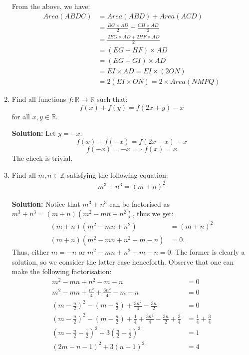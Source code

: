 \documentclass{article}
\begin{document}
\begin{enumerate}[itemsep=24pt]
From the above, we have:
\begin{align*}
Area(ABDC) & = Area(ABD) + Area(ACD) \\
           & = \frac{BG \times AD}{2} + \frac{CH \times AD}{2} \\
           & = \frac{2EG \times AD + 2HF \times AD}{2}\\
           & = (EG + HF) \times AD\\
           & = (EG + GI) \times AD\\
           & = EI \times AD = EI \times (2ON) \\
           & = 2(EI \times ON) = 2 \times Area(NMPQ)
\end{align*}


\item %
Find all functions $f:\mathbb{R}\to\mathbb{R}$ such that:
\[f(x) + f(y) = f(2x+y) - x\] for all $x,y\in\mathbb{R}$.

\textbf{Solution:} Let $y = -x$:
\[f(x) + f(-x) = f(2x-x) - x\]
\[f(-x) = -x\implies f(x) = x\]
The check is trivial.

\item 
Find all $m,n\in \mathbb{Z}$ satisfying the following equation:
\begin{align}
m^3 + n^3 = (m+n)^2 
\end{align}

\textbf{Solution:} Notice that $m^3 + n^3$ can be factorised as $m^3 + n^3=(m+n)(m^{2} -mn + n^{2})$, thus we get:
\begin{align*}
    (m+n)(m^{2} -mn + n^{2}) & = (m+n)^2\\
    (m+n)(m^{2} -mn + n^{2} -m -n) & = 0.
\end{align*}
Thus, either $m = -n$ or $m^{2} -mn + n^{2} -m -n = 0$. The former is clearly a solution, so we consider the latter case henceforth. Observe that one can make the following factorisation:
\begin{align}
    m^{2} -mn + n^{2} -m -n & = 0 \nonumber\\ 
    m^{2} - mn + \frac{n^{2}}{4} + \frac{3n^{2}}{4} - m -n & = 0 \nonumber\\
    \left(m - \frac{n}{2}\right)^{2} - \left(m - \frac{n}{2}\right) + \frac{3n^{2}}{4} - \frac{3n}{2} & = 0 \nonumber\\
    \left(m - \frac{n}{2}\right)^{2} - \left(m - \frac{n}{2}\right) + \frac{1}{4} + \frac{3n^{2}}{4} - \frac{3n}{2} + \frac{3}{4} & = \frac{1}{4} +\frac{3}{4} \nonumber\\
    \left(m - \frac{n}{2} - \frac{1}{2}\right)^{2} +3\left(\frac{n}{2} - \frac{1}{2}\right)^{2} & = 1 \nonumber\\
    (2m - n - 1)^{2} + 3(n-1)^{2} & = 4 
\end{align}


\end{enumerate}
\end{document}
